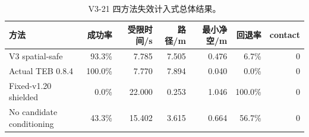 \begin{table}[htbp]
\centering
\caption{V3-21 四方法失效计入式总体结果。}
\label{tab:v321-methods}
\small
\begin{tabular}{lrrrrrr}
\toprule
方法 & 成功率 & 受限时间/s & 路径/m & 最小净空/m & 回退率 & contact\\
\midrule
V3 spatial-safe & 93.3\% & 7.785 & 7.505 & 0.476 & 6.7\% & 0\\
Actual TEB 0.8.4 & 100.0\% & 7.770 & 7.894 & 0.040 & 0.0\% & 0\\
Fixed-v1.20 shielded & 0.0\% & 22.000 & 0.253 & 1.046 & 100.0\% & 0\\
No candidate conditioning & 43.3\% & 15.402 & 3.615 & 0.664 & 56.7\% & 0\\
\bottomrule
\end{tabular}
\end{table}
